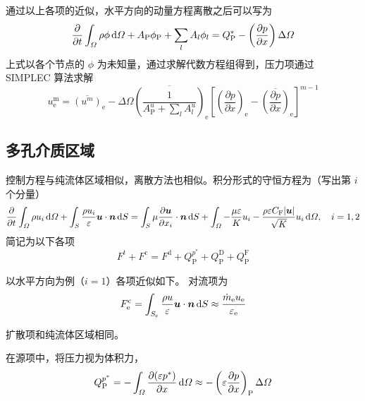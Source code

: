 通过以上各项的近似，水平方向的动量方程离散之后可以写为%
\begin{equation}
	\frac{\partial}{\partial t}\int_{\varOmega}\rho\phi\,\mathrm{d}\varOmega +
	A_{\mathrm{P}}\phi_{\mathrm{P}} + \sum_l A_l\phi_l = Q_{\mathrm{P}}^* - \left(\frac{\partial p}{\partial x}\right) \Delta\varOmega
\end{equation}
上式以各个节点的 $\phi$ 为未知量，通过求解代数方程组得到，压力项通过 SIMPLEC 算法求解 \cite{Van1984}%
\begin{equation}\label{eq: Simplec}
	u_{\mathrm{e}}^{\mathrm{m}} = \overline{(u^m)}_{\mathrm{e}} - \Delta\varOmega \overline{\left(\frac{1}{A_{\mathrm{P}}^u+\sum_lA_l^u}\right)}_{\mathrm{e}} \left[\left(\frac{\partial p}{\partial x}\right)_{\mathrm{e}}-\overline{\left(\frac{\partial p}{\partial x}\right)}_{\mathrm{e}}\right]^{m-1}
\end{equation}

\subsection{多孔介质区域}

控制方程与纯流体区域相似，离散方法也相似。积分形式的守恒方程为（写出第 $i$ 个分量）
\begin{equation}\label{eq: porous conservation}
	\frac{\partial}{\partial t}\int_{\varOmega}\rho u_i\,\mathrm{d}\varOmega +
	\int_S\frac{\rho u_i}{\varepsilon}\bm{u}\cdot\bm{n}\,\mathrm{d} S =
	\int_S\mu\frac{\partial\bm{u}}{\partial x_i}\cdot\bm{n}\,\mathrm{d} S +
	\int_{\varOmega} - \frac{\mu\varepsilon}{K}u_i - 
	\frac{\rho\varepsilon C_{\mathrm{F}}\lvert\bm{u}\vert}{\sqrt K}u_i \,\mathrm{d}\varOmega, \quad i=1,2
\end{equation}
简记为以下各项
\begin{equation}
	F^t + F^{\mathrm{c}} = F^{\mathrm{d}} + Q_{\mathrm{P}}^{p^*} + Q_{\mathrm{P}}^{\mathrm{D}} + Q_{\mathrm{P}}^{\mathrm{F}}
\end{equation}

以水平方向为例（$i=1$）各项近似如下。
对流项为
\begin{equation}
	F_{\mathrm{e}}^{\mathrm{c}} = 
	\int_{S_{\mathrm{e}}}\frac{\rho u}{\varepsilon}\bm{u}\cdot\bm{n}\,\mathrm{d} S \approx \frac{\dot m_{\mathrm{e}} u_{\mathrm{e}}}{\varepsilon_{\mathrm{e}}}
\end{equation}

扩散项和纯流体区域相同。

在源项中，将压力视为体积力，
\begin{equation}
	Q_{\mathrm{P}}^{p^*} = 
	-\int_{\varOmega} \frac{\partial(\varepsilon p^*)}{\partial x} \,\mathrm{d}\varOmega \approx 
	-\left(\varepsilon \frac{\partial p}{\partial x}\right)_{\mathrm{P}} \Delta\varOmega
\end{equation}

